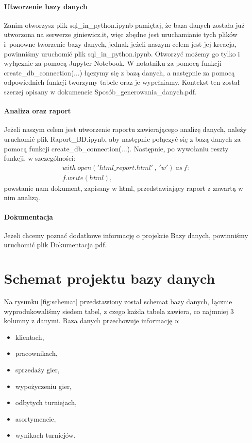 \documentclass{article}
\theoremstyle{break}
\begin{document}
	\paragraph{Utworzenie bazy danych}
	Zanim otworzysz plik sql\_in\_python.ipynb pamiętaj, że baza danych została już utworzona na serwerze giniewicz.it, więc zbędne jest uruchamianie tych plików i~ponowne tworzenie bazy danych, jednak jeżeli naszym celem jest jej kreacja, powinniśmy uruchomić plik sql\_in\_python.ipynb. Otworzyć możemy go tylko i wyłącznie za pomocą Jupyter Notebook. W notatniku za pomocą funkcji create\_db\_connection($\dots$) łączymy się z bazą danych, a następnie za pomocą odpowiednich funkcji tworzymy tabele oraz je wypełniamy. Kontekst ten został szerzej opisany w dokumencie Sposób\_generowania\_danych.pdf. \\
	\paragraph{Analiza oraz raport}
	Jeżeli naszym celem jest utworzenie raportu zawierającego analizę danych, należy uruchomić plik Raport\_BD.ipynb, aby następnie połączyć się z bazą danych za pomocą funkcji create\_db\_connection($\dots$). Następnie, po wywołaniu reszty funkcji, w szczególności:
	$$\begin{multlined}
			with \ open('html\_report.html'\ ,\ 'w') \ as \  f: \\
			f.write(html),
	\end{multlined}$$
	powstanie nam dokument, zapisany w html, przedstawiający raport z zawartą w nim analizą.
	\paragraph{Dokumentacja}
	Jeżeli chcemy poznać dodatkowe informację o projekcie Bazy danych, powinniśmy uruchomić plik Dokumentacja.pdf.
	
	\section{Schemat projektu bazy danych}
	Na rysunku \ref{fig:schemat} przedstawiony został schemat bazy danych, łącznie wyprodukowaliśmy siedem tabel, z czego każda tabela zawiera, co najmniej 3 kolumny z danymi. Baza danych przechowuje informację o:
	\begin{itemize}
		\item klientach,
		\item pracownikach,
		\item sprzedaży gier,
		\item wypożyczeniu gier,
		\item odbytych turniejach,
		\item asortymencie,
		\item wynikach turniejów.
	\end{itemize}
\end{document}
